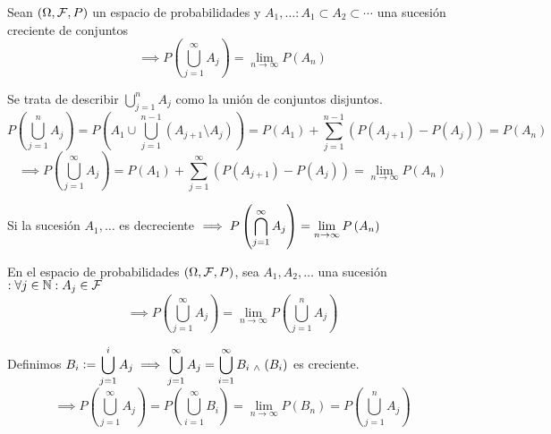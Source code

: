 \begin{prop}
	Sean $(\Omega, \mathcal{F}, P)$ un espacio de probabilidades y $ A_1, \dots : A_1 \subset A_2 \subset \cdots$ una sucesión creciente de conjuntos
	\[\implies P\left(\bigcup_{j=1}^\infty A_j\right)=\lim_{n\rightarrow\infty}P\left(A_n\right)\]
	\begin{dem}
		Se trata de describir $\bigcup_{j=1}^n A_j$ como la unión de conjuntos disjuntos.
		\[P\left(\bigcup_{j=1}^n A_j\right)=P\left(A_1\cup\bigcup_{j=1}^{n-1} \left(A_{j+1}\setminus A_j\right)\right)=P(A_1)+\sum_{j=1}^{n-1}\left(P(A_{j+1})-P(A_j)\right)=P(A_n)\]
		\[\implies P\left(\bigcup_{j=1}^\infty A_j\right) = P(A_1)+\sum_{j=1}^{\infty}\left(P(A_{j+1})-P(A_j)\right)=\lim_{n\rightarrow\infty}P(A_n)\]
	\end{dem}
\end{prop}

\begin{prop}
	Si la sucesión $A_1, \dots$ es decreciente
	$\displaystyle\implies P\left(\bigcap_{j=1}^\infty A_j\right)=\lim_{n\rightarrow\infty}P\left(A_n\right)$
\end{prop}

\begin{teo}
	En el espacio de probabilidades $(\Omega, \mathcal{F}, P)$, sea $A_1, A_2, \dots$ una sucesión $: \forall j \in \mathbb{N} : A_j \in \mathcal{F}$
	\[\implies P\left(\bigcup_{j=1}^\infty A_j\right)=\lim_{n\rightarrow\infty}P\left(\bigcup_{j=1}^n A_j\right)\]
	\begin{dem}
		Definimos $\displaystyle B_i\vcentcolon=\bigcup_{j=1}^i A_j \implies \bigcup_{j=1}^\infty A_j = \bigcup_{i=1}^\infty B_i \; _{\wedge} \; (B_i)$ es creciente.
		\[\implies P\left(\bigcup_{j=1}^\infty A_j\right) = P\left(\bigcup_{i=1}^\infty B_i\right) = \lim_{n\rightarrow\infty}P\left(B_n\right)=P\left(\bigcup_{j=1}^n A_j\right)\]
	\end{dem}
\end{teo}

